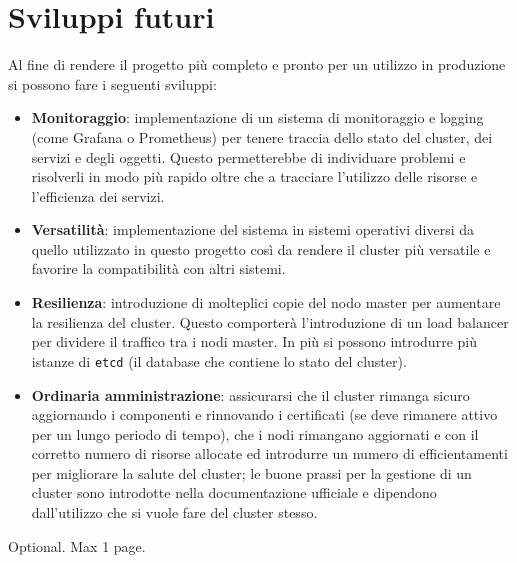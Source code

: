 \documentclass[12pt,a4paper,openright,twoside]{book}
\begin{document}
\section{Sviluppi futuri}
Al fine di rendere il progetto più completo e pronto per un utilizzo in produzione si possono fare i seguenti sviluppi:
\begin{itemize}
    \item {\textbf{Monitoraggio}: implementazione di un sistema di monitoraggio e logging (come Grafana o Prometheus) per tenere traccia dello stato del cluster, dei servizi e degli oggetti.
    Questo permetterebbe di individuare problemi e risolverli in modo più rapido oltre che a tracciare l'utilizzo delle risorse e l'efficienza dei servizi.
    }
    \item{\textbf{Versatilità}: implementazione del sistema in sistemi operativi diversi da quello utilizzato in questo progetto così da rendere il cluster più versatile e favorire la compatibilità con altri sistemi.
    }
    \item{
        \textbf{Resilienza}: introduzione di molteplici copie del nodo master per aumentare la resilienza del cluster. Questo comporterà l'introduzione di un load balancer per dividere il traffico tra i nodi master.
        In più si possono introdurre più istanze di \texttt{etcd} (il database che contiene lo stato del cluster)\cite{kubernetes}.
    }
    \item {
        \textbf{Ordinaria amministrazione}: assicurarsi che il cluster rimanga sicuro aggiornando i componenti e rinnovando i certificati (se deve rimanere
        attivo per un lungo periodo di tempo), che i nodi rimangano aggiornati e con il corretto numero di risorse allocate ed introdurre un numero di efficientamenti
        per migliorare la salute del cluster; le buone prassi per la gestione di un cluster sono introdotte nella documentazione ufficiale e dipendono dall'utilizzo che
        si vuole fare del cluster stesso\cite{kubernetes}.
    }
\end{itemize}


\backmatter





\begin{acknowledgements} %
Optional. Max 1 page.
\end{acknowledgements}
\end{document}
